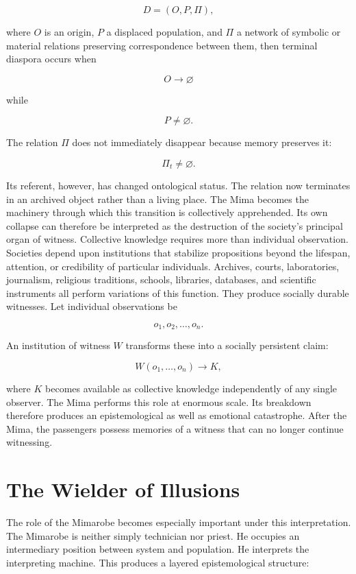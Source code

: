 \documentclass[11pt,oneside]{book}
\theoremstyle{definition}
\theoremstyle{remark}
\begin{document}
\[
D=(O,P,\Pi),
\]

where \(O\) is an origin, \(P\) a displaced population, and \(\Pi\) a network of symbolic or
material relations preserving correspondence between them, then terminal diaspora occurs when

\[
O\rightarrow\varnothing
\]

while

\[
P\neq\varnothing.
\]

The relation \(\Pi\) does not immediately disappear because memory preserves it:

\[
\Pi_t\neq\varnothing.
\]

Its referent, however, has changed ontological status. The relation now terminates in an archived
object rather than a living place. The Mima becomes the machinery through which this transition is
collectively apprehended. Its own collapse can therefore be interpreted as the destruction of the
society's principal organ of witness. Collective knowledge requires more than individual
observation. Societies depend upon institutions that stabilize propositions beyond the lifespan,
attention, or credibility of particular individuals. Archives, courts, laboratories, journalism,
religious traditions, schools, libraries, databases, and scientific instruments all perform
variations of this function. They produce socially durable witnesses. Let individual observations be

\[
o_1,o_2,\ldots,o_n.
\]

An institution of witness \(W\) transforms these into a socially persistent claim:

\[
W(o_1,\ldots,o_n)\rightarrow K,
\]

where \(K\) becomes available as collective knowledge independently of any single observer. The Mima
performs this role at enormous scale. Its breakdown therefore produces an epistemological as well as
emotional catastrophe. After the Mima, the passengers possess memories of a witness that can no
longer continue witnessing.

\section{The Wielder of Illusions}

The role of the Mimarobe becomes especially important under this interpretation. The Mimarobe is
neither simply technician nor priest. He occupies an intermediary position between system and
population. He interprets the interpreting machine. This produces a layered epistemological
structure:
\end{document}
